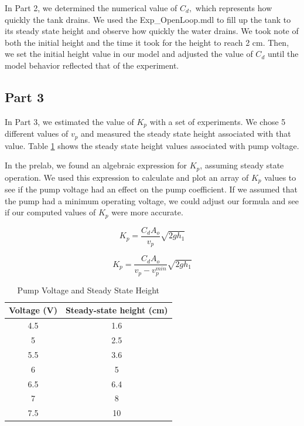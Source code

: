 \documentclass[12pt]{article}
\numberwithin{equation}{section}
\begin{document}
  In Part 2, we determined the numerical value of $ C_d, $ which represents how quickly the tank drains. We used the Exp\_OpenLoop.mdl to fill up the tank to its steady state height and observe how quickly the water drains. We took note of both the initial height and the time it took for the height to reach 2 cm. Then, we set the initial height value in our model and adjusted the value of $ C_d $ until the model behavior reflected that of the experiment.

  \newpage

  \subsection{Part 3}

  In Part 3, we estimated the value of $ K_p $ with a set of experiments. We chose 5 different values of $ v_p $ and measured the steady state height associated with that value. Table \ref{tab:tab1} shows the steady state height values associated with pump voltage.

  In the prelab, we found an algebraic expression for $ K_p $, assuming steady state operation. We used this expression to calculate and plot an array of $ K_p $ values to see if the pump voltage had an effect on the pump coefficient. If we assumed that the pump had a minimum operating voltage, we could adjust our formula and see if our computed values of $ K_p $ were more accurate.

  \begin{equation}
    K_p = \frac{C_dA_o}{v_p} \sqrt{2gh_1}
  \end{equation}

  \begin{equation}
    K_p = \frac{C_dA_o}{v_p - v_p^{min}} \sqrt{2gh_1}
  \end{equation}

  \begin{table}
    \centering
    \caption{Pump Voltage and Steady State Height}
    \begin{tabular}{c c}
      Voltage (V) & Steady-state height (cm) \\
      \hline
      4.5 & 1.6 \\
      5 & 2.5 \\
      5.5 & 3.6 \\
      6 & 5 \\
      6.5 & 6.4 \\
      7 & 8 \\
      7.5 & 10 \\
    \end{tabular}
    \label{tab:tab1}
  \end{table}
\end{document}
